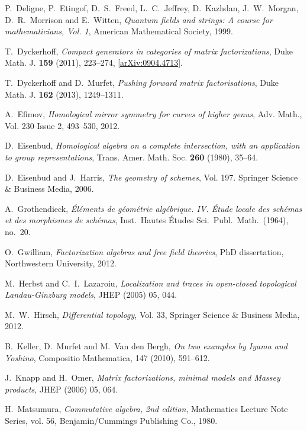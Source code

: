 \documentclass[english,letter paper,12pt,leqno]{article}
\theoremstyle{example}
\numberwithin{equation}{section}
\begin{document}
\begin{thebibliography}{BHLS03}
P.~Deligne, P.~Etingof, D.~S.~Freed, L.~C.~Jeffrey, D.~Kazhdan, J.~W.~Morgan, D.~R.~Morrison and E.~Witten, \textsl{Quantum fields and strings: A course for mathematicians, Vol. 1}, American Mathematical Society, 1999. 

T.~Dyckerhoff, \textsl{Compact generators in categories of matrix factorizations},
  Duke Math. J. \textbf{159} (2011), 223--274,
  \href{http://arxiv.org/abs/0904.4713}{[arXiv:0904.4713]}.
    
T.~Dyckerhoff and D.~Murfet, \textsl{Pushing forward matrix factorisations}, Duke Math. J. \textbf{162} (2013), 1249--1311.

A.~Efimov, \textsl{Homological mirror symmetry for curves of higher genus}, Adv. Math., Vol. 230 Issue 2, 493--530, 2012.

D.~Eisenbud, \textsl{Homological algebra on a complete intersection, with an application to group representations}, Trans. Amer. Math. Soc. {\bf 260} (1980), 35--64. 

D.~Eisenbud and J.~Harris, \textsl{The geometry of schemes}, Vol. 197. Springer Science \& Business Media, 2006.

A.~Grothendieck, \textsl{\'{E}l\'ements de g\'eom\'etrie alg\'ebrique. {IV}. \'{E}tude
  locale des sch\'emas et des morphismes de sch\'emas}, Inst.~Hautes \'Etudes
  Sci.~Publ.~Math.~(1964), no.~20.

O.~Gwilliam, \textsl{Factorization algebras and free field theories}, PhD dissertation, Northwestern University, 2012.

M.~Herbst and C.~I.~Lazaroiu, \textsl{Localization and traces in open-closed topological Landau-Ginzburg models}, JHEP (2005) 05, 044.

M.~W.~Hirsch, \textsl{Differential topology}, Vol. 33, Springer Science \& Business Media, 2012.

B.~Keller, D.~Murfet and M.~Van den Bergh, \textsl{On two examples by Iyama and Yoshino}, Compositio Mathematica, 147 (2010), 591--612.

J.~Knapp and H.~Omer, \textsl{Matrix factorizations, minimal models and Massey products}, JHEP (2006) 05, 064.

H.~Matsumura, \textsl{Commutative algebra, 2nd edition}, Mathematics Lecture Note Series, vol. 56, Benjamin/Cummings Publishing Co., 1980.


\end{thebibliography}
\end{document}
